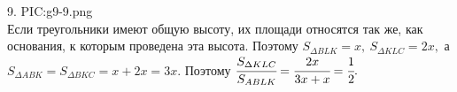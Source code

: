 9. {{PIC:g9-9.png}}\\
Если треугольники имеют общую высоту, их площади относятся так же, как основания, к которым проведена эта высота. Поэтому $S_{\Delta BLK}=x,\ S_{\Delta KLC}=2x,$ а $S_{\Delta ABK}=S_{\Delta BKC}=x+2x=3x.$ Поэтому $\cfrac{S_{\Delta KLC}}{S_{ABLK}}=\cfrac{2x}{3x+x}=\cfrac{1}{2}.$\\
